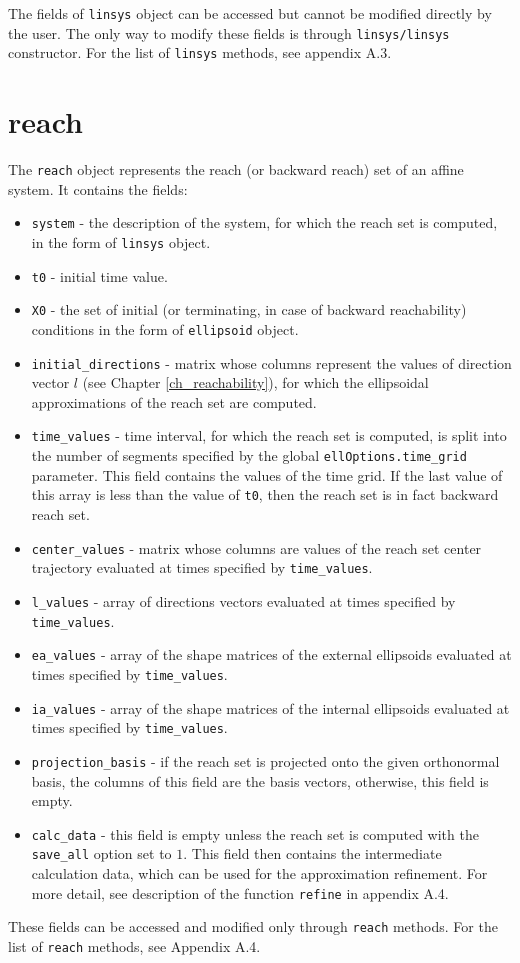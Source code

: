 The fields of {\tt linsys} object can be accessed but cannot be modified
directly by the user. The only way to modify these fields is through
{\tt linsys/linsys} constructor.
For the list of {\tt linsys} methods, see appendix A.3.



\section{reach}
The {\tt reach} object represents the reach (or backward reach)
set of an affine system. It contains the fields:
\begin{itemize}
\item {\tt system} - the description of the system, for which the reach set
is computed, in the form of {\tt linsys} object.
\item {\tt t0} - initial time value.
\item {\tt X0} - the set of initial (or terminating, in case of backward
reachability) conditions in the form of {\tt ellipsoid}
object.
\item {\tt initial\_directions} - matrix whose columns represent the values
of direction vector $l$ (see Chapter \ref{ch_reachability}),
for which the ellipsoidal approximations of the reach set are computed.
\item {\tt time\_values} - time interval, for which the reach set is computed,
is split into the number of segments specified by the global
{\tt ellOptions.time\_grid} parameter. This field contains the values
of the time grid. If the last value of this array is less than the value
of {\tt t0}, then the reach set is in fact backward reach set.
\item {\tt center\_values} - matrix whose columns are values of the reach set
center trajectory evaluated at times specified by {\tt time\_values}.
\item {\tt l\_values} - array of directions vectors evaluated at times
specified by {\tt time\_values}.
\item {\tt ea\_values} - array of the shape matrices of the external ellipsoids
evaluated at times specified by {\tt time\_values}.
\item {\tt ia\_values} - array of the shape matrices of the internal ellipsoids
evaluated at times specified by {\tt time\_values}.
\item {\tt projection\_basis} - if the reach set is projected onto the given
orthonormal basis, the columns of this field are the basis vectors, otherwise,
this field is empty.
\item {\tt calc\_data} - this field is empty unless the reach set is computed
with the {\tt save\_all} option set to $1$. This field then contains the
intermediate calculation data, which can be used for the approximation
refinement. For more detail, see description of the function
{\tt refine} in appendix A.4.
\end{itemize}
These fields can be accessed and modified only through {\tt reach} methods.
For the list of {\tt reach} methods, see Appendix A.4.





